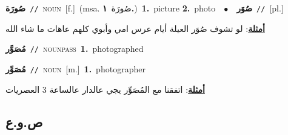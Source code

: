 \documentclass[10pt,a4paper,twoside]{article} %
\begin{document}
\begin{multicols}{2}
{\setlength\topsep{0pt}\textbf{\foreignlanguage{arabic}{صُورَة}}\ {\color{gray}\texttt{//}\color{black}}\ \textsc{noun}\ [f.]\ \color{gray}(msa. \foreignlanguage{arabic}{صُورَة}~\foreignlanguage{arabic}{\textbf{١.}})\color{black}\ \textbf{1.}~picture  \textbf{2.}~photo\ \ $\bullet$\ \ \setlength\topsep{0pt}\textbf{\foreignlanguage{arabic}{صُوَر}}\ {\color{gray}\texttt{//}\color{black}}\ [pl.]\  \begin{flushright}\color{gray}\foreignlanguage{arabic}{\textbf{\underline{\foreignlanguage{arabic}{أمثلة}}}: لو تشوف صُوَر العيلة أيام عرس امي وأبوي كلهم عاهات ما شاء الله}\end{flushright}\color{black}} \vspace{2mm}

{\setlength\topsep{0pt}\textbf{\foreignlanguage{arabic}{مُصَوَّر}}\ {\color{gray}\texttt{//}\color{black}}\ \textsc{noun\textunderscore pass}\ \textbf{1.}~photographed\ } \vspace{2mm}

{\setlength\topsep{0pt}\textbf{\foreignlanguage{arabic}{مُصَوِّر}}\ {\color{gray}\texttt{//}\color{black}}\ \textsc{noun}\ [m.]\ \textbf{1.}~photographer\  \begin{flushright}\color{gray}\foreignlanguage{arabic}{\textbf{\underline{\foreignlanguage{arabic}{أمثلة}}}: اتفقنا مع المُصَوِّر يجي عالدار عالساعة 3 العصريات}\end{flushright}\color{black}} \vspace{2mm}

\vspace{-3mm}
\subsection*{\color{blue}\foreignlanguage{arabic}{ص.و.ع}\color{blue}{}} 


\end{multicols}
\end{document}
